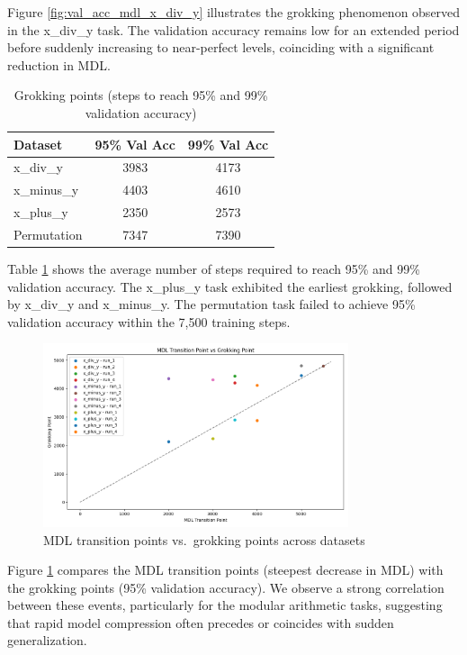 \documentclass{article} %
\begin{document}
Figure \ref{fig:val_acc_mdl_x_div_y} illustrates the grokking phenomenon observed in the x\_div\_y task. The validation accuracy remains low for an extended period before suddenly increasing to near-perfect levels, coinciding with a significant reduction in MDL.

\begin{table}[h]
\centering
\caption{Grokking points (steps to reach 95\% and 99\% validation accuracy)}
\label{tab:grokking_points}
\begin{tabular}{lcc}
\toprule
Dataset & 95\% Val Acc & 99\% Val Acc \\
\midrule
x\_div\_y & 3983 & 4173 \\
x\_minus\_y & 4403 & 4610 \\
x\_plus\_y & 2350 & 2573 \\
Permutation & 7347 & 7390 \\
\bottomrule
\end{tabular}
\end{table}

Table \ref{tab:grokking_points} shows the average number of steps required to reach 95\% and 99\% validation accuracy. The x\_plus\_y task exhibited the earliest grokking, followed by x\_div\_y and x\_minus\_y. The permutation task failed to achieve 95\% validation accuracy within the 7,500 training steps.

\begin{figure}[h]
\centering
\includegraphics[width=0.8\textwidth]{mdl_transition_vs_grokking_scatter.png}
\caption{MDL transition points vs.\ grokking points across datasets}
\label{fig:mdl_transition_vs_grokking}
\end{figure}

Figure \ref{fig:mdl_transition_vs_grokking} compares the MDL transition points (steepest decrease in MDL) with the grokking points (95\% validation accuracy). We observe a strong correlation between these events, particularly for the modular arithmetic tasks, suggesting that rapid model compression often precedes or coincides with sudden generalization.
\end{document}
